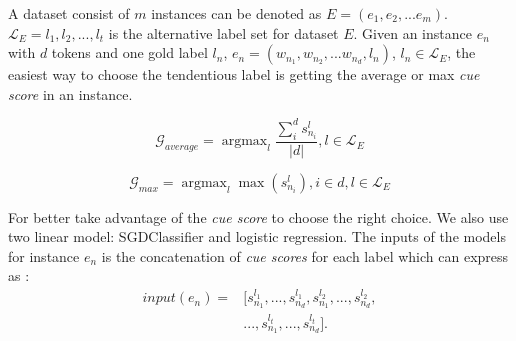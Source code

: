 A dataset consist of $m$ instances can be denoted as $E = (e_1, e_2, ...e_m)$. 
${\mathcal{L}}_E={l_1, l_2, ..., l_t}$ is the alternative label 
set for dataset $E$.
Given an instance $e_n$ with $d$ tokens and one gold label $l_n$, $e_{n}=({w}_{n_1}, {w}_{n_2},... w_{n_d}, l_n)$,  $l_n\in{\mathcal{L}_E}$, 
the easiest way to choose the tendentious label is getting the average or max \textit{cue score} in an instance. 

\begin{equation}
     \mathcal{G}_{average} = \mathop{\arg\max}_{l}{\frac{\sum_{i}^{d}s^{l}_{n_i}}{\left | d \right |}},  l\in{{\mathcal{L}}_E}
\end{equation}

\begin{equation}
 \mathcal{G}_{max} = \mathop{\arg\max}_{l}{\max(s^{l}_{n_i})},  i\in{d},l\in{{\mathcal{L}}_E}
\end{equation}



For better take advantage of the \textit{cue score} to choose the right choice. We also use two linear model: SGDClassifier and 
logistic regression. The inputs of the models for instance $e_n$ is the concatenation of \textit{cue scores} for each label which can express as : 
\begin{equation}
\begin{aligned}
input(e_n) = &[ s^{l_1}_{n_1},..., s^{l_1}_{n_d},  s^{l_2}_{n_1},..., s^{l_2}_{n_d},\\&
..., s^{l_t}_{n_1},..., s^{l_t}_{n_d}].
\end{aligned}
\end{equation}

